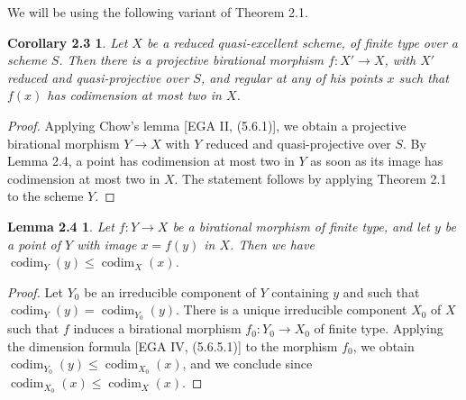 \documentclass[11pt]{article}
\newcommand{\codim}{\operatorname{codim}}
\newtheorem*{supportcor}{Corollary 2.3}
\newtheorem*{supportlem}{Lemma 2.4}
\begin{document}
We will be using the following variant of Theorem 2.1.

\begin{supportcor}
Let $X$ be a reduced quasi-excellent scheme, of finite type over a scheme $S$. Then there is a projective birational morphism $f:X'\to X$, with $X'$ reduced and quasi-projective over $S$, and regular at any of his points $x$ such that $f(x)$ has codimension at most two in $X$.
\end{supportcor}
\begin{proof}
Applying Chow's lemma [EGA II, (5.6.1)], we obtain a projective birational morphism $Y\to X$ with $Y$ reduced and quasi-projective over $S$. By Lemma 2.4, a point has codimension at most two in $Y$ as soon as its image has codimension at most two in $X$. The statement follows by applying Theorem 2.1 to the scheme $Y$.
\end{proof}

\begin{supportlem}
Let $f:Y\to X$ be a birational morphism of finite type, and let $y$ be a point of $Y$ with image $x=f(y)$ in $X$. Then we have $\codim_Y(y)\leq\codim_X(x)$.
\end{supportlem}
\begin{proof}
\sloppy
Let $Y_0$ be an irreducible component of $Y$ containing $y$ and such that $\codim_Y(y)=\allowbreak\codim_{Y_0}(y)$. There is a unique irreducible component $X_0$ of $X$ such that $f$ induces a birational morphism $f_0:Y_0\to X_0$ of finite type. Applying the dimension formula [EGA IV, (5.6.5.1)] to the morphism $f_0$, we obtain $\codim_{Y_0}(y)\leq\codim_{X_0}(x)$, and we conclude since $\codim_{X_0}(x)\leq\codim_X(x)$.
\end{proof}

\end{document}
